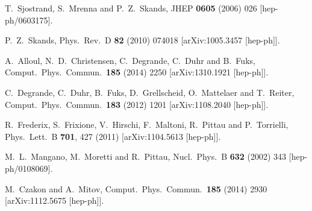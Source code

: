 \documentclass[preprintnumbers,superscriptaddress,nofootinbib,aps,prd,floatfix]{revtex4}
\begin{document}
\begin{thebibliography}{99}
  T.~Sjostrand, S.~Mrenna and P.~Z.~Skands,
  JHEP {\bf 0605} (2006) 026
  [hep-ph/0603175].
  
  P.~Z.~Skands,
  Phys.\ Rev.\ D {\bf 82} (2010) 074018
  [arXiv:1005.3457 [hep-ph]].

  A.~Alloul, N.~D.~Christensen, C.~Degrande, C.~Duhr and B.~Fuks,
  Comput.\ Phys.\ Commun.\  {\bf 185} (2014) 2250
  [arXiv:1310.1921 [hep-ph]].

  C.~Degrande, C.~Duhr, B.~Fuks, D.~Grellscheid, O.~Mattelaer and T.~Reiter,
  Comput.\ Phys.\ Commun.\  {\bf 183} (2012) 1201
  [arXiv:1108.2040 [hep-ph]].

  R.~Frederix, S.~Frixione, V.~Hirschi, F.~Maltoni, R.~Pittau and P.~Torrielli,
  Phys.\ Lett.\ B {\bf 701}, 427 (2011)
  [arXiv:1104.5613 [hep-ph]].

  M.~L.~Mangano, M.~Moretti and R.~Pittau,
  Nucl.\ Phys.\ B {\bf 632} (2002) 343
  [hep-ph/0108069].
  
  M.~Czakon and A.~Mitov,
  Comput.\ Phys.\ Commun.\  {\bf 185} (2014) 2930
  [arXiv:1112.5675 [hep-ph]].


\end{thebibliography}
\end{document}
